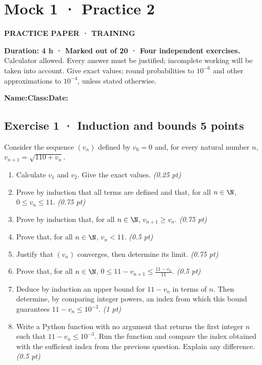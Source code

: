 \fi

\clearpage{}\label{sujet:5-2}

\section*{Mock 1 · Practice 2}

{\sffamily\bfseries\color{teal}PRACTICE PAPER · TRAINING\par}

\textbf{Duration: 4 h · Marked out of 20 · Four independent exercises.}\\Calculator allowed. Every answer must be justified; incomplete working will be taken into account. Give exact values; round probabilities to $10^{-6}$ and other approximations to $10^{-4}$, unless stated otherwise.

\smallskip\textbf{Name:}\enspace\dotfill\quad\textbf{Class:}\enspace\dotfill\quad\textbf{Date:}\enspace\dotfill

\subsection*{Exercise 1 · Induction and bounds \hfill 5 points}Consider the sequence $(v_n)$ defined by $v_0=0$ and, for every natural number $n$, $v_{n+1}=\sqrt{110+v_n}$.

\begin{enumerate}

\item Calculate $v_1$ and $v_2$. Give the exact values. \hfill\textit{(0.25 pt)}

\item Prove by induction that all terms are defined and that, for all $n\in\N$, $0\le v_n\le11$. \hfill\textit{(0.75 pt)}

\item Prove by induction that, for all $n\in\N$, $v_{n+1}\ge v_n$. \hfill\textit{(0.75 pt)}

\item Prove that, for all $n\in\N$, $v_n<11$. \hfill\textit{(0.5 pt)}

\item Justify that $(v_n)$ converges, then determine its limit. \hfill\textit{(0.75 pt)}

\item Prove that, for all $n\in\N$, $0\le 11-v_{n+1}\le\frac{11-v_n}{11}$. \hfill\textit{(0.5 pt)}

\item Deduce by induction an upper bound for $11-v_n$ in terms of $n$. Then determine, by comparing integer powers, an index from which this bound guarantees $11-v_n\le10^{-3}$. \hfill\textit{(1 pt)}

\item Write a Python function with no argument that returns the first integer $n$ such that $11-v_n\le10^{-3}$. Run the function and compare the index obtained with the sufficient index from the previous question. Explain any difference. \hfill\textit{(0.5 pt)}

\end{enumerate}


